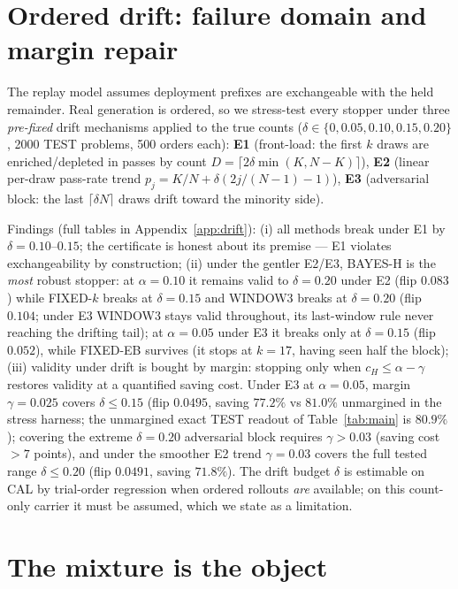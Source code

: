 \documentclass{article}
\theoremstyle{definition}
\theoremstyle{remark}
\newcommand{\cert}{c_H}
\begin{document}
\section{Ordered drift: failure domain and margin repair}
\label{sec:drift}

The replay model assumes deployment prefixes are exchangeable with the held
remainder. Real generation is ordered, so we stress-test every stopper under
three \emph{pre-fixed} drift mechanisms applied to the true counts
($\delta\in\{0,0.05,0.10,0.15,0.20\}$, 2000 TEST problems, 500 orders each):
\textbf{E1} (front-load: the first $k$ draws are enriched/depleted in passes
by count $D=\lceil 2\delta\min(K,N{-}K)\rceil$), \textbf{E2} (linear per-draw
pass-rate trend $p_j=K/N+\delta(2j/(N{-}1){-}1)$), \textbf{E3} (adversarial
block: the last $\lceil\delta N\rceil$ draws drift toward the minority side).

Findings (full tables in Appendix~\ref{app:drift}):
(i) all methods break under E1 by $\delta=0.10$--$0.15$; the certificate is
honest about its premise --- E1 violates exchangeability by construction;
(ii) under the gentler E2/E3, BAYES-H is the \emph{most} robust stopper: at
$\alpha=0.10$ it remains valid to $\delta=0.20$ under E2 (flip $0.083$) while
FIXED-$k$ breaks at $\delta=0.15$ and WINDOW3 breaks at $\delta=0.20$
(flip $0.104$; under E3 WINDOW3 stays valid throughout, its last-window
rule never reaching the drifting tail); at $\alpha=0.05$ under E3 it
breaks only at $\delta=0.15$ (flip $0.052$), while FIXED-EB survives (it stops
at $k=17$, having seen half the block); (iii) validity under drift is bought
by margin: stopping only when $\cert\le\alpha-\gamma$ restores validity at a
quantified saving cost. Under E3 at $\alpha=0.05$, margin $\gamma=0.025$
covers $\delta\le0.15$ (flip $0.0495$, saving $77.2\%$ vs $81.0\%$
unmargined in the stress harness; the unmargined exact TEST readout of
Table~\ref{tab:main} is $80.9\%$); covering the extreme $\delta=0.20$
adversarial block requires
$\gamma>0.03$ (saving cost $>7$ points), and under the smoother E2 trend
$\gamma=0.03$ covers the full tested range $\delta\le0.20$ (flip $0.0491$,
saving $71.8\%$). The drift budget $\delta$ is estimable on CAL by trial-order
regression when ordered rollouts \emph{are} available; on this count-only
carrier it must be assumed, which we state as a limitation.

\section{The mixture is the object}
\label{sec:mixture}
\end{document}
